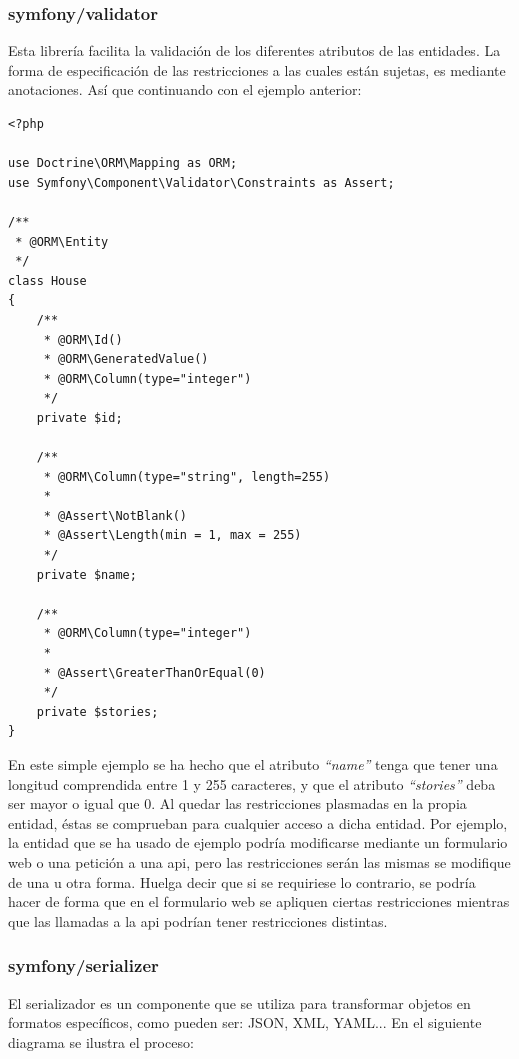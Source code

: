 \subsubsection{symfony/validator}
\label{sec:tech:valid}
Esta librería facilita la validación de los diferentes atributos de las
entidades. La forma de especificación de las restricciones a las cuales están
sujetas, es mediante anotaciones. Así que continuando con el ejemplo anterior:

\begin{verbatim}
<?php

use Doctrine\ORM\Mapping as ORM;
use Symfony\Component\Validator\Constraints as Assert;

/**
 * @ORM\Entity
 */
class House
{
    /**
     * @ORM\Id()
     * @ORM\GeneratedValue()
     * @ORM\Column(type="integer")
     */
    private $id;

    /**
     * @ORM\Column(type="string", length=255)
     *
     * @Assert\NotBlank()
     * @Assert\Length(min = 1, max = 255)
     */
    private $name;

    /**
     * @ORM\Column(type="integer")
     *
     * @Assert\GreaterThanOrEqual(0)
     */
    private $stories;
}
\end{verbatim}

En este simple ejemplo se ha hecho que el atributo \textit{``name''} tenga que
tener una longitud comprendida entre 1 y 255 caracteres, y que el atributo
\textit{``stories''} deba ser mayor o igual que 0. Al quedar las restricciones
plasmadas en la propia entidad, éstas se comprueban para cualquier acceso a
dicha entidad. Por ejemplo, la entidad que se ha usado de ejemplo podría
modificarse mediante un formulario web o una petición a una \gls{api}, pero las
restricciones serán las mismas se modifique de una u otra forma. Huelga decir
que si se requiriese lo contrario, se podría hacer de forma que en el
formulario web se apliquen ciertas restricciones mientras que las llamadas a la
\gls{api} podrían tener restricciones distintas.

\subsubsection{symfony/serializer}
\label{sec:serializer}
El serializador es un componente que se utiliza para transformar objetos en
formatos específicos, como pueden ser: JSON, XML,
YAML\cite{symfony_serializer}... En el siguiente diagrama se ilustra el
proceso:

